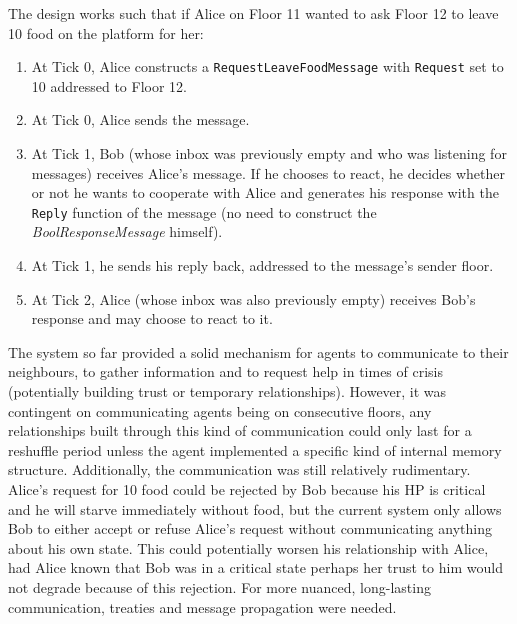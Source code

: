 The design works such that if Alice on Floor 11 wanted to ask Floor 12 to leave 10 food on the platform for her:
\begin{enumerate}
    \item At Tick 0, Alice constructs a \texttt{RequestLeaveFoodMessage} with \texttt{Request} set to 10 addressed to Floor 12.
    \item At Tick 0, Alice sends the message.
    \item At Tick 1, Bob (whose inbox was previously empty and who was listening for messages) receives Alice's message. If he chooses to react, he decides whether or not he wants to cooperate with Alice and generates his response with the \texttt{Reply} function of the message (no need to construct the \textit{BoolResponseMessage} himself).
    \item At Tick 1, he sends his reply back, addressed to the message's sender floor.
    \item At Tick 2, Alice (whose inbox was also previously empty) receives Bob's response and may choose to react to it.
\end{enumerate}
The system so far provided a solid mechanism for agents to communicate to their neighbours, to gather information and to request help in times of crisis (potentially building trust or temporary relationships). However, it was contingent on communicating agents being on consecutive floors, any relationships built through this kind of communication could only last for a reshuffle period unless the agent implemented a specific kind of internal memory structure. Additionally, the communication was still relatively rudimentary. Alice's request for 10 food could be rejected by Bob because his HP is critical and he will starve immediately without food, but the current system only allows Bob to either accept or refuse Alice's request without communicating anything about his own state. This could potentially worsen his relationship with Alice, had Alice known that Bob was in a critical state perhaps her trust to him would not degrade because of this rejection. \newline 
For more nuanced, long-lasting communication, treaties and message propagation were needed.

